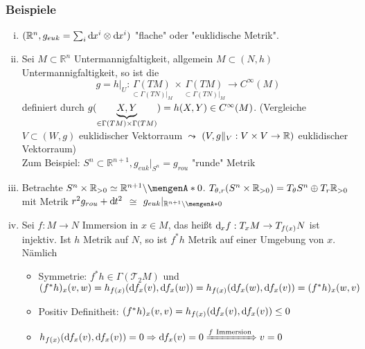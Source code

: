 \subsubsection{Beispiele}
\label{ssub:23}
\begin{enumerate}[(i)]
\item $(\mathbb{R}^n,g_{euk} = \sum_i \mathrm{d}\mkern-1.0mu x^i \otimes \mathrm{d}\mkern-1.0mu x^i)$ "flache" oder "euklidische Metrik".
\item Sei $M\subset \mathds{R}^n$ Untermannigfaltigkeit, allgemein $M\subset (N,h)$ Untermannigfaltigkeit, so ist die 
\[
g = h\vert_U :\underset{\subset \Gamma(TN)\vert_M}{\Gamma(TM)} \times \underset{\subset \Gamma(TN)\vert_M}{\Gamma(TM)} \to C^\infty (M)
\]
definiert durch $g(\underbrace{X,Y}_{\in \Gamma(TM)\times \Gamma(TM)}) = h(X,Y)\in C^\infty (M)$. (Vergleiche $V\subset (W,g)$ euklidischer Vektorraum $\leadsto$ $(V,g\Vert_V: V\times V \to \mathbb{R})$ euklidischer Vektorraum)\\
Zum Beispiel: $S^n \subset \mathds{R}^{n+1}, g_{euk}\vert_{S^n} = g_{rou}$ "runde" Metrik
\item Betrachte $S^n \times \mathds{R}_{>0} \simeq \mathds{R}^{n+1}\backslash \set{0}$. 
$T_{\theta,r} (S^n\times \mathbb{R}_{>0}) = T_\theta S^n \oplus T_r \mathbb{R}_{>0}$ mit Metrik $r^2 g_{rou} + \mathrm{d}\mkern-1.0mu t^2$ $\cong$ $g_{euk}\vert_{\mathds{R}^{n+1}\backslash \set{0}}$
\item Sei $f:M\to N$ Immersion in $x\in M$, das heißt $\mathrm{d}\mkern-1.0mu_x f: T_x M \to T_{f(x)} N$ ist injektiv. Ist $h$ Metrik auf $N$, so ist $f^* h$ Metrik auf einer Umgebung von $x$. Nämlich
\begin{itemize}
\item Symmetrie: $f^* h \in \Gamma(\mathcal{T}_2 M)$ und $(f^* h)_x (v,w) = h_{f(x)} (\mathrm{d}\mkern-1.0mu f_x (v),\mathrm{d}\mkern-1.0mu f_x (w)) = h_{f(x)} (\mathrm{d}\mkern-1.0mu f_x (w),\mathrm{d}\mkern-1.0mu f_x (v)) = (f^* h)_x (w,v)$
\item Positiv Definitheit: $(f^* h)_x (v,v) = h_{f(x)} (\mathrm{d}\mkern-1.0mu f_x (v),\mathrm{d}\mkern-1.0mu f_x (v)) \leq 0$
\item $h_{f(x)} \enbrace{\mathd f_x (v),\mathd f_x (v)} = 0 \Rightarrow \mathd f_x (v) = 0 \xRightarrow{f\ \text{Immersion}} v = 0$
\end{itemize}
\end{enumerate}


